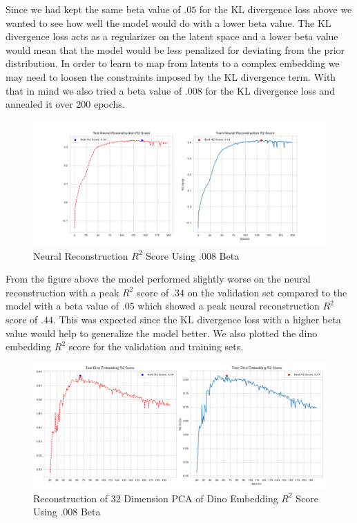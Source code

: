 \documentclass[12pt, letterpaper]{article}
\begin{document}
Since we had kept the same beta value of $.05$ for the KL divergence loss above we wanted to see how well the model would do with a lower beta value. The KL divergence loss acts as a regularizer on the latent space and a lower beta value would mean that the model would be less penalized for deviating from the prior distribution. In order to learn to map from latents to a complex embedding we may need to loosen the constraints imposed by the KL divergence term. With that in mind we also tried a beta value of $.008$ for the KL divergence loss and annealed it over $200$ epochs.

\begin{figure}[H]
    \centering
    \includegraphics[width=1.0\textwidth]{x_r2_128dim_503_top_var_200_epochs_0.008_beta_2_layer_.9_pca_dino_embed.png}
    \caption{Neural Reconstruction $R^2$ Score Using .008 Beta}
    \label{fig:vae_guidance_dino_pca_neural_reconstruction_.008_beta}
\end{figure}

From the figure above the model performed slightly worse on the neural reconstruction with a peak $R^2$ score of $.34$ on the validation set compared to the model with a beta value of $.05$ which showed a peak neural reconstruction $R^2$ score of $.44$. This was expected since the KL divergence loss with a higher beta value would help to generalize the model better. We also plotted the dino embedding $R^2$ score for the validation and training sets.

\begin{figure}[H]
    \centering
    \includegraphics[width=.9\textwidth]{.9_pca_dino_embed_r2_128dim_503_top_var_200_epochs_0.008_beta_2_layer.png}
    \caption{Reconstruction of $32$ Dimension PCA of Dino Embedding $R^2$ Score Using .008 Beta}
    \label{fig:vae_guidance_dino_pca_dino_embed_r2_.008_beta}
\end{figure}
\end{document}
